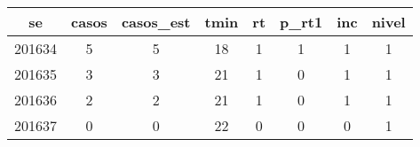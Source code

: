 \begin{tabular}{c|ccccccc}
  \hline
se & casos & casos\_est & tmin & rt & p\_rt1 & inc & nivel \\ 
  \hline
201634 & 5 & 5 & 18 & 1 & 1 & 1 & 1 \\ 
  201635 & 3 & 3 & 21 & 1 & 0 & 1 & 1 \\ 
  201636 & 2 & 2 & 21 & 1 & 0 & 1 & 1 \\ 
  201637 & 0 & 0 & 22 & 0 & 0 & 0 & 1 \\ 
   \hline
\end{tabular}
